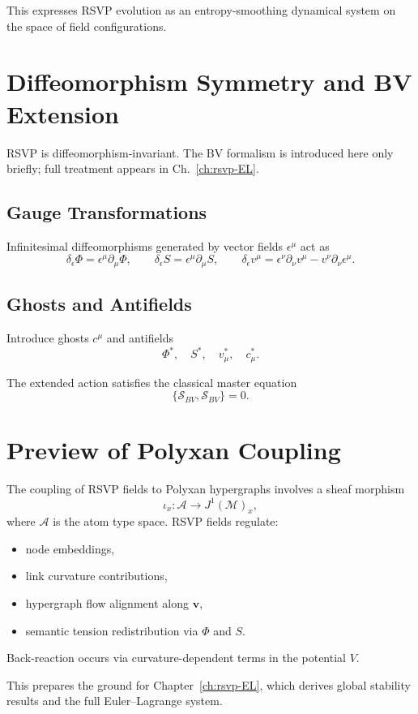 This expresses RSVP evolution as an entropy-smoothing dynamical system on the
space of field configurations.

\section{Diffeomorphism Symmetry and BV Extension}

RSVP is diffeomorphism-invariant. The BV formalism is introduced here only
briefly; full treatment appears in Ch.~\ref{ch:rsvp-EL}.

\subsection{Gauge Transformations}

Infinitesimal diffeomorphisms generated by vector fields $\epsilon^\mu$ act as
\[
\delta_\epsilon \Phi = \epsilon^\mu \partial_\mu \Phi,
\qquad
\delta_\epsilon S = \epsilon^\mu \partial_\mu S,
\qquad
\delta_\epsilon v^\mu = \epsilon^\nu \partial_\nu v^\mu - v^\nu \partial_\nu \epsilon^\mu.
\]

\subsection{Ghosts and Antifields}

Introduce ghosts $c^\mu$ and antifields
\[
\Phi^*, \quad S^*, \quad v_\mu^*, \quad c_\mu^*.
\]

The extended action satisfies the classical master equation
\[
\{\mathcal{S}_{BV},\mathcal{S}_{BV}\} = 0.
\]

\section{Preview of Polyxan Coupling}

The coupling of RSVP fields to Polyxan hypergraphs involves a sheaf morphism
\[
\iota_x : \mathcal{A} \to J^1(\mathcal{M})_x,
\]
where $\mathcal{A}$ is the atom type space. RSVP fields regulate:
\begin{itemize}
\item node embeddings,
\item link curvature contributions,
\item hypergraph flow alignment along $\mathbf{v}$,
\item semantic tension redistribution via $\Phi$ and $S$.
\end{itemize}

Back-reaction occurs via curvature-dependent terms in the potential $V$.

This prepares the ground for Chapter~\ref{ch:rsvp-EL}, which derives global
stability results and the full Euler--Lagrange system.

